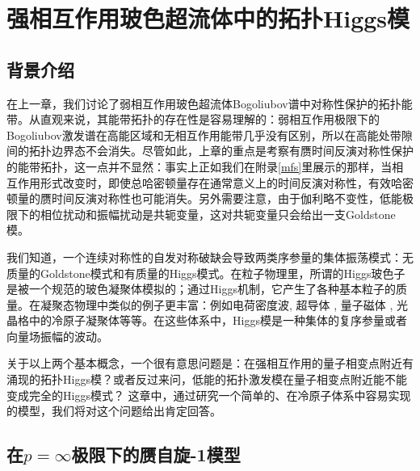 
\chapter{强相互作用玻色超流体中的拓扑Higgs模}
\label{ch3}

\section{背景介绍}

在上一章，我们讨论了弱相互作用玻色超流体Bogoliubov谱中对称性保护的拓扑能带。从直观来说，其能带拓扑的存在性是容易理解的：弱相互作用极限下的Bogoliubov激发谱在高能区域和无相互作用能带几乎没有区别，所以在高能处带隙间的拓扑边界态不会消失。尽管如此，上章的重点是考察有赝时间反演对称性保护的能带拓扑，这一点并不显然：事实上正如我们在附录\ref{mfs}里展示的那样，当相互作用形式改变时，即使总哈密顿量存在通常意义上的时间反演对称性，有效哈密顿量的赝时间反演对称性也可能消失。另外需要注意，由于伽利略不变性，低能极限下的相位扰动和振幅扰动是共轭变量，这对共轭变量只会给出一支Goldstone模。

我们知道，一个连续对称性的自发对称破缺会导致两类序参量的集体振荡模式：无质量的Goldstone模式和有质量的Higgs模式。在粒子物理里，所谓的Higgs玻色子\cite{Higgs1964}是被一个规范的玻色凝聚体模拟的；通过Higgs机制，它产生了各种基本粒子的质量。在凝聚态物理中类似的例子更丰富：例如电荷密度波\cite{Yusupov2010}, 超导体 \cite{Tsuchiya2018}, 量子磁体 \cite{Su2020}, 光晶格中的冷原子凝聚体\cite{Liu2015}等等。在这些体系中，Higgs模是一种集体的复序参量或者向量场振幅的波动。

关于以上两个基本概念，一个很有意思问题是：在强相互作用的量子相变点附近有涌现的拓扑Higgs模？或者反过来问，低能的拓扑激发模在量子相变点附近能不能变成完全的Higgs模式？
这章中，通过研究一个简单的、在冷原子体系中容易实现的模型，我们将对这个问题给出肯定回答。


\section{在$p=\infty$极限下的赝自旋-1模型}

